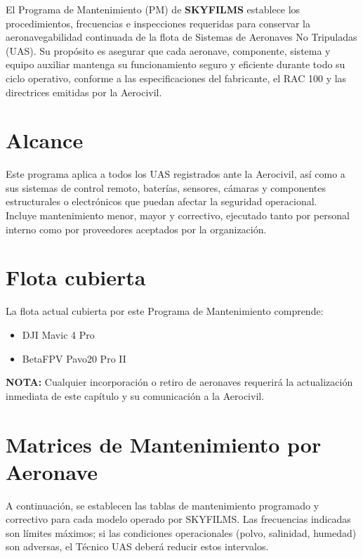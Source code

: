 El Programa de Mantenimiento (PM) de \textbf{SKYFILMS} establece los procedimientos, frecuencias e inspecciones requeridas para conservar la aeronavegabilidad continuada de la flota de Sistemas de Aeronaves No Tripuladas (UAS). 
Su propósito es asegurar que cada aeronave, componente, sistema y equipo auxiliar mantenga su funcionamiento seguro y eficiente durante todo su ciclo operativo, conforme a las especificaciones del fabricante, el RAC 100 y las directrices emitidas por la Aerocivil.

\section{Alcance}

Este programa aplica a todos los UAS registrados ante la Aerocivil, así como a sus sistemas de control remoto, baterías, sensores, cámaras y componentes estructurales o electrónicos que puedan afectar la seguridad operacional.\\

Incluye mantenimiento menor, mayor y correctivo, ejecutado tanto por personal interno como por proveedores aceptados por la organización.

\section{Flota cubierta}

La flota actual cubierta por este Programa de Mantenimiento comprende:

\begin{itemize}
    \item DJI Mavic 4 Pro
    \item BetaFPV Pavo20 Pro II
\end{itemize}

\textbf{NOTA:} Cualquier incorporación o retiro de aeronaves requerirá la actualización inmediata de este capítulo y su comunicación a la Aerocivil.


\section{Matrices de Mantenimiento por Aeronave}
A continuación, se establecen las tablas de mantenimiento programado y correctivo para cada modelo operado por SKYFILMS. Las frecuencias indicadas son límites máximos; si las condiciones operacionales (polvo, salinidad, humedad) son adversas, el Técnico UAS deberá reducir estos intervalos.

